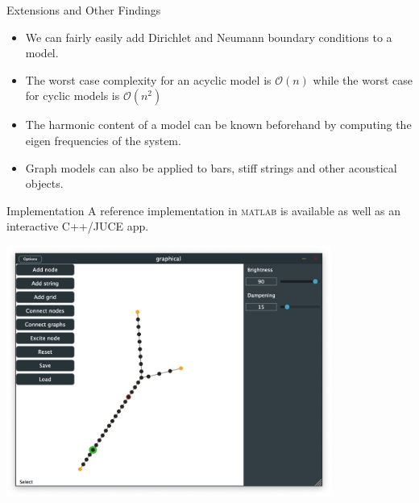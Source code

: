 \documentclass[a0paper,portrait]{baposter}
\begin{document}
\begin{poster}
\begin{posterbox}[name=other,column=2,below=dense]{Extensions and Other Findings}
\begin{itemize}
    \item We can fairly easily add Dirichlet and Neumann boundary conditions to
        a model.
    \item The worst case complexity for an acyclic model is $\mathcal{O}(n)$
        while the worst case for cyclic models is $\mathcal{O}(n^2)$
    \item The harmonic content of a model can be known beforehand by computing the
        eigen frequencies of the system.
    \item Graph models can also be applied to bars, stiff strings and other
        acoustical objects.
\end{itemize}
\end{posterbox}

\begin{posterbox}[name=implementation,column=2,below=other]{Implementation}
    A reference implementation in \textsc{matlab} is available as well as an
    interactive C++/JUCE app.
    \begin{center}
        \includegraphics[width=0.8\textwidth]{gui.png}
    \end{center}
\end{posterbox}
\end{poster}
\end{document}
